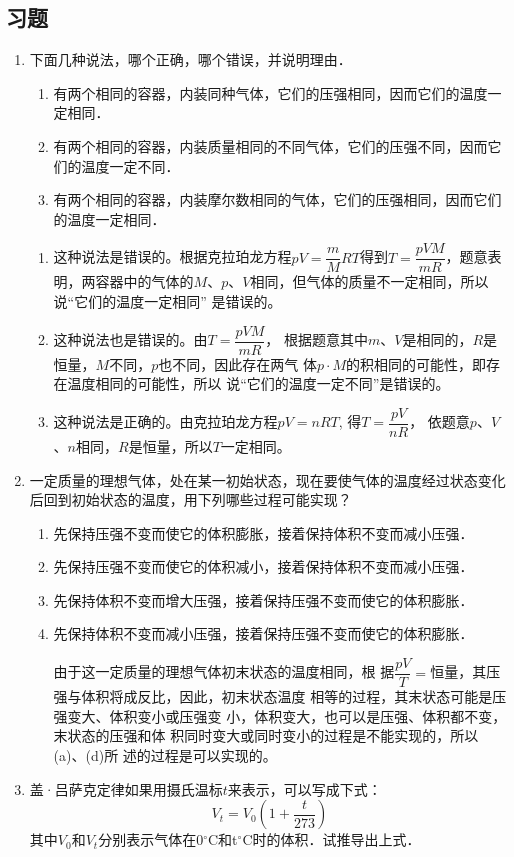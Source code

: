 \subsection{习题}
\begin{enumerate}
	\item 下面几种说法，哪个正确，哪个错误，并说明理由．
	\begin{enumerate}
		\item 有两个相同的容器，内装同种气体，它们的压强相同，因而它们的温度一定相同．
		\item 有两个相同的容器，内装质量相同的不同气体，它们的压强不同，因而它们的温度一定不同．
		\item 有两个相同的容器，内装摩尔数相同的气体，它们的压强相同，因而它们的温度一定相同．
	\end{enumerate}

\begin{solution}
\begin{enumerate}
    \item 这种说法是错误的。根据克拉珀龙方程$pV=\dfrac{m}{M}RT$得到$T=\dfrac{pVM}{mR}$，题意表明，两容器中的气体的$M$、$p$、$V$相同，但气体的质量不一定相同，所以说“它们的温度一定相同”
    是错误的。
    \item 这种说法也是错误的。由$T=\dfrac{pVM}{mR}$，
    根据题意其中$m$、$V$是相同的，$R$是恒量，$M$不同，$p$也不同，因此存在两气
    体$p\cdot M$的积相同的可能性，即存在温度相同的可能性，所以
    说“它们的温度一定不同”是错误的。
    \item 这种说法是正确的。由克拉珀龙方程$pV=nRT$, 得$T=\dfrac{pV}{nR}$，
    依题意$p$、$V$、$n$相同，$R$是恒量，所以$T$一定相同。
\end{enumerate}
\end{solution}
\item 一定质量的理想气体，处在某一初始状态，现在要使气体的温度经过状态变化后回到初始状态的温度，用下列哪些过程可能实现？
\begin{enumerate}
	\item 先保持压强不变而使它的体积膨胀，接着保持体积不变而减小压强．
\item 先保持压强不变而使它的体积减小，接着保持体积不变而减小压强．
\item 先保持体积不变而增大压强，接着保持压强不变而使它的体积膨胀．
\item 先保持体积不变而减小压强，接着保持压强不变而使它的体积膨胀．	 

\begin{solution}
    由于这一定质量的理想气体初末状态的温度相同，根
    据$\dfrac{pV}{T}=$恒量，其压强与体积将成反比，因此，初末状态温度
    相等的过程，其末状态可能是压强变大、体积变小或压强变
小，体积变大，也可以是压强、体积都不变，末状态的压强和体
积同时变大或同时变小的过程是不能实现的，所以(a)、(d)所
述的过程是可以实现的。
\end{solution}
\end{enumerate}
\item 盖·吕萨克定律如果用摄氏温标$t$来表示，可以写成下式：
\[V_t=V_0\left(1+\frac{t}{273}\right) \]
其中$V_0$和$V_t$分别表示气体在0$^\circ$C和t$^\circ$C时的体积．试推导出上式．


\end{enumerate}
